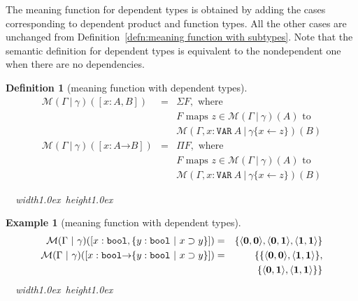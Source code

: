 \documentclass [12pt,twoside]{cslreport}
\newcommand{\thmbox}
   {{\ \hfill\hbox{%
      \vrule width1.0ex height1.0ex
   }\parfillskip 0pt }}
\newtheorem{example}[thm]{Example}
\newcommand{\aro}{\mathord\rightarrow} %
\newcommand{\pair}[1]{\langle #1 \rangle}
\newcommand{\funtype}[2]{[#1 \aro #2]}
\newcommand{\tupletype}[1]{[#1]}
\newcommand{\Mgamma}[1]{{\mathcal M}(\Gamma\vbar\gamma)(#1)}
\newcommand{\oneb}{\mathbf{1}}
\newcommand{\zerob}{\mathbf{0}}
\newcommand{\ttbool}{\mathtt{bool}}
\newcommand{\ttvar}{\mathtt{VAR}}
\newcommand{\vbar}{\ |\ }
\newenvironment{Eg}[1]{\begin{example}[#1]\label{eg:#1}\em }{\thmbox\end{example}}
\newtheorem{definition}{Definition}
\newenvironment{Defn}[1]{\begin{definition}[#1]\label{defn:#1}}{
\thmbox\end{definition}}
\begin{document}
The meaning function for dependent types is obtained by adding the
cases corresponding to 
dependent product and function types.  All the other cases are unchanged from
Definition~\ref{defn:meaning function with subtypes}\@.  Note that the
semantic definition  for dependent types is 
equivalent to the nondependent one when there are no dependencies.
\begin{Defn}{meaning function with dependent types}
\begin{eqnarray*}
  \Mgamma{\tupletype{x : A, B}} & = &
    \Sigma{F}, \mbox{ where }\\& &
     F \mbox{ maps } z \in \Mgamma{A} \mbox{ to }\\& & \mathcal{M}(\Gamma, x : \ttvar{}\
A\vbar \gamma \{x\gets z \})(B)\\
%
  \Mgamma{\funtype{x:A}{B}} & = &  \Pi{F}, \mbox{ where }\\& &
                        F \mbox{ maps } z \in \Mgamma{A} \mbox{ to }\\& &  \mathcal{M}(\Gamma,
x : \ttvar{}\  A\vbar \gamma\{x\gets z\})(B)  
%    
\end{eqnarray*}
\end{Defn}

\begin{Eg}{meaning function with dependent types}
\begin{eqnarray*}
\Mgamma{\tupletype{x : \ttbool,  \{ y : \ttbool \vbar x \supset 
y\}}}
& = & \{\pair{\zerob, \zerob}, \pair{\zerob, \oneb},
\pair{\oneb, \oneb}\}\\ 
\Mgamma{\funtype{x : \ttbool}{\{ y : \ttbool \vbar x \supset 
y\}}} & = & \{\{\pair{\zerob, \zerob}, \pair{\oneb, \oneb}\},\\&&\hspace*{1ex}
              \{\pair{\zerob, \oneb}, \pair{\oneb, \oneb}\}\}
\end{eqnarray*}
\end{Eg}
\end{document}
